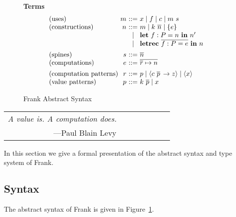 \documentclass[11pt]{article}
\makeatletter
\newcommand{\fighead}{\textbf}
\newcommand{\many}{\overline}
\newcommand\ba{\begin{array}}
\newcommand\ea{\end{array}}
\newenvironment{syntax}{\[\ba{@{}l@{~}r@{~}c@{~}l@{}}}{\ea\]\ignorespacesafterend}
\newcommand{\key}[1]{\textbf{#1}} %
\newcommand{\handleSymbol}{\rightarrow}
\newcommand{\handle}[2]{{#1} \handleSymbol {#2}}
\newcommand{\thunk}[1]{\{{#1}\}}
\newcommand{\force}[1]{{#1}!}
\newcommand\slab[1]{(\textrm{#1})}
\newcommand{\effin}[1]{\langle {#1} \rangle}
\makeatother
\begin{document}
\begin{figure}
\fighead{Terms}
\begin{syntax}
\slab{uses}               &m       &::=& x \mid f \mid c \mid m~s \\
\slab{constructions}      &n       &::=& m \mid k~\many{n} \mid \thunk{e} \\
                       &       &\mid& \key{let}~f : P = n~\key{in}~n' \\
                       &       &\mid& \key{letrec}~\many{f : P = e}~\key{in}~n \\
[1ex]
\slab{spines}          &s       &::=& \many{n} \\
\slab{computations}     &e       &::=& \many{\many{r} \mapsto n}
\\[1ex]
\slab{computation patterns}&r &::=& p
                               \mid \effin{\handle{c~\many{p}\,}{z}}
                               \mid \effin{x} \\
\slab{value patterns}&p       &::=& k~\many{p} \mid x        \\
\end{syntax}

\caption{Frank Abstract Syntax}
\label{fig:frank-syntax}
\end{figure}

\begin{center}
\begin{tabular}{c}
{\em A value is. A computation does.} $\qquad \qquad \qquad $\\
\hfill---Paul Blain Levy~\cite{Levy2004}
\end{tabular}
\end{center}
%
In this section we give a formal presentation of the abstract syntax
and type system of Frank.

\subsection{Syntax}
%
The abstract syntax of Frank is given in
Figure~\ref{fig:frank-syntax}.
\end{document}
